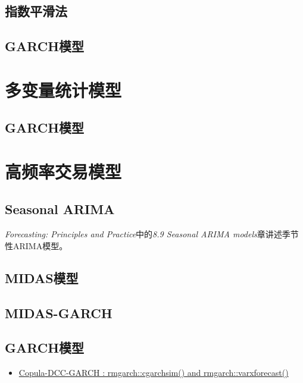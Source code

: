 \documentclass[]{book}
\providecommand{\tightlist}{%
  \setlength{\itemsep}{0pt}\setlength{\parskip}{0pt}}
\begin{document}
\subsection{指数平滑法}

\subsection{GARCH模型}\label{garch}

\section{多变量统计模型}

\subsection{GARCH模型}\label{garch-1}

\subsection{}\label{section}

\section{高频率交易模型}

\subsection{Seasonal ARIMA}\label{seasonal-arima}

\emph{Forecasting: Principles and Practice}中的\emph{8.9 Seasonal ARIMA
models}章讲述季节性ARIMA模型。

\subsection{MIDAS模型}\label{midas}

\subsection{MIDAS-GARCH}\label{midas-garch}

\subsection{GARCH模型}\label{garch-2}

\begin{itemize}
\tightlist
\item
  \href{https://stackoverflow.com/questions/52391296/copula-dcc-garch-rmgarchcgarchsim-and-rmgarchvarxforecast}{Copula-DCC-GARCH
  : rmgarch::cgarchsim() and rmgarch::varxforecast()}
\end{itemize}
\end{document}
